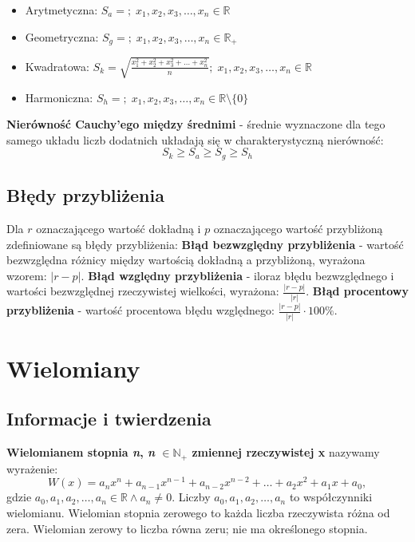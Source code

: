 \documentclass[14pt,a4paper]{extarticle}
\begin{document}
\begin{itemize}
   \item Arytmetyczna: $S_{a} = $$;\; x_{1}, x_{2}, x_{3}, \ldots, x_{n} \in \mathbb{R}$
   \item Geometryczna: $S_{g} = $$;\; x_{1}, x_{2}, x_{3}, \ldots, x_{n} \in \mathbb{R}_{+}$
   \item Kwadratowa: $S_{k} = \sqrt{\frac{\displaystyle x_{1}^{2} + x_{2}^{2} + x_{3}^{2} + \ldots + x_{n}^{2}}{\displaystyle n}};\; x_{1}, x_{2}, x_{3}, \ldots, x_{n} \in \mathbb{R}$
   \item Harmoniczna: $S_{h} = $$;\; x_{1}, x_{2}, x_{3}, \ldots, x_{n} \in \mathbb{R} \!\setminus\!\{0\} $
\end{itemize}
\textbf{Nierówność Cauchy'ego między średnimi} - średnie wyznaczone dla tego samego układu liczb dodatnich układają się w charakterystyczną nierówność:
$$S_{k} \geq S_{a} \geq S_{g} \geq S_{h}$$

\newpage
\noindent\subsection{Błędy przybliżenia}
Dla $r$ oznaczającego wartość dokładną i $p$ oznaczającego wartość przybliżoną zdefiniowane są błędy przybliżenia:\hfill\break
\noindent\textbf{Błąd bezwzględny przybliżenia} - wartość bezwzględna różnicy między wartością dokładną a przybliżoną, wyrażona wzorem: $\vert r - p\vert$.\hfill\break
\textbf{Błąd względny przybliżenia} - iloraz błędu bezwzględnego i wartości bezwzględnej rzeczywistej wielkości, wyrażona: $\frac{\displaystyle\vert r - p\vert}{\displaystyle\vert r\vert}$.\hfill\break
\textbf{Błąd procentowy przybliżenia} - wartość procentowa błędu względnego: \hfill\break$\frac{\displaystyle\vert r - p\vert}{\displaystyle\vert r\vert} \cdot 100\%$.\\
\newpage

\section{Wielomiany}
\subsection{Informacje i twierdzenia}
\textbf{Wielomianem stopnia \textit{n}, \textit{n} $\in \mathbb{N}_{+}$ zmiennej rzeczywistej x} nazywamy wyrażenie:
$$W(x) = a_{n}x^{n}+a_{n-1}x^{n-1}+a_{n-2}x^{n-2}+\ldots+a_{2}x^{2}+a_{1}x+a_{0},$$
gdzie $a_{0}, a_{1}, a_{2}, \ldots, a_{n} \in \mathbb{R} \land a_{n} \neq 0$. Liczby $a_{0}, a_{1}, a_{2}, \ldots, a_{n}$ to współczynniki wielomianu.
Wielomian stopnia zerowego to każda liczba rzeczywista różna od zera. Wielomian zerowy to liczba równa zeru; nie ma określonego stopnia.\\
\smallskip
\end{document}
